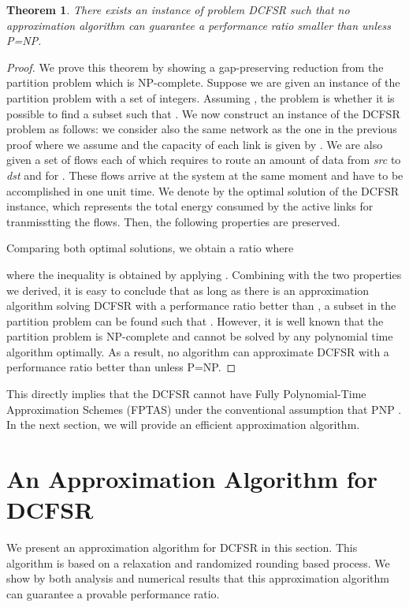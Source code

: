\documentclass[10pt, conference, compsocconf]{IEEEtran}
\newtheorem{theorem}{Theorem}
\begin{document}
\begin{theorem}
There exists an instance of problem DCFSR such that no approximation algorithm can guarantee a performance ratio smaller than  unless P=NP.
\end{theorem}

\begin{proof}
We prove this theorem by showing a gap-preserving reduction from the partition problem which is NP-complete. Suppose we are given an instance of the partition problem with a set  of  integers. Assuming , the problem is whether it is possible to find a subset  such that .  We now construct an instance of the DCFSR problem as follows:  we consider also the same network as the one in the previous proof where we assume  and the capacity of each link is given by . We are also given a set  of flows each of which requires to route an amount  of data from \emph{src} to \emph{dst} and  for . These flows arrive at the system at the same moment and have to be accomplished in one unit time. We denote by  the optimal solution of the DCFSR instance, which represents the total energy consumed by the active links for tranmisstting the flows. Then, the following properties are preserved.
	
	Comparing both optimal solutions, we obtain a ratio  where
	
where the inequality is obtained by applying .
Combining with the two properties we derived, it is easy to conclude that as long as there is an approximation algorithm solving DCFSR with a performance ratio better than , a subset  in the partition problem can be found such that . However, it is well known that the partition problem is NP-complete and cannot be solved by any polynomial time algorithm optimally. As a result, no algorithm can approximate DCFSR with a performance ratio better than  unless P=NP.
\end{proof}
This directly implies that the DCFSR cannot have Fully Polynomial-Time Approximation Schemes (FPTAS) under the conventional assumption that PNP \cite{Vazirani-2004}. In the next section, we will provide an efficient approximation algorithm.

\section{An Approximation Algorithm for DCFSR}
\label{sec:approx}

We present an approximation algorithm for DCFSR in this section. This algorithm is based on a relaxation and randomized rounding based process. We show by both analysis and numerical results that this approximation algorithm can guarantee a provable performance ratio.
\end{document}
